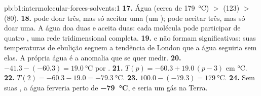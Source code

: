 \begin{solution}{pb:b1:intermolecular-forces-solvents:1}
\textbf{17.} Água (cerca de \qty{179}{\celsius}) $>$  (123) $>$
 (80).
\textbf{18.}  pode doar três, mas só aceitar uma (um );  pode aceitar três, mas só doar uma. A água doa duas e
aceita duas: cada molécula pode participar de quatro , uma rede tridimensional completa.
\textbf{19.}  e  não formam 
significativas: suas temperaturas de ebulição seguem a tendência de
London que a água seguiria sem elas. A própria água é a anomalia que se
quer medir.
\textbf{20.} $-41.3 - (-60.3) = \qty{19.0}{\celsius}$ por .
\textbf{21.} $T(p) = -60.3 + 19.0\,(p - 3)$ em \unit{\celsius}.
\textbf{22.} $T(2) = -60.3 - 19.0 = \qty{-79.3}{\celsius}$.
\textbf{23.} $100.0 - (-79.3) = \qty{179}{\celsius}$.
\textbf{24.} Sem suas , a água ferveria perto de
\textbf{\qty{-79}{\celsius}}, e seria um gás na Terra.
\end{solution}
